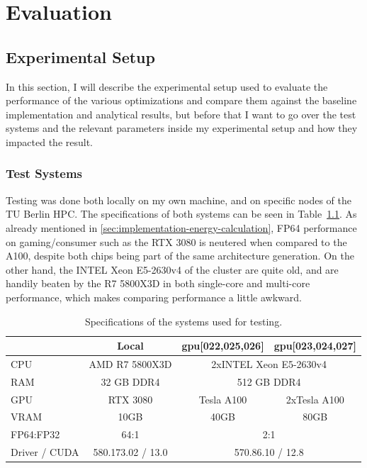 \chapter{Evaluation}
\label{sec:evaluation}

\section{Experimental Setup}
\label{sec:evaluation-experimental-setup}

In this section, I will describe the experimental setup used to evaluate the performance of the various optimizations and compare them against the baseline implementation and analytical results, but before that I want to go over the test systems and the relevant parameters inside my experimental setup and how they impacted the result.

\subsection{Test Systems}
\label{sec:evaluation-experimental-setup-test-systems}

Testing was done both locally on my own machine, and on specific nodes of the TU Berlin HPC. 
The specifications of both systems can be seen in Table~\ref{tab:test-systems}. 
As already mentioned in \ref{sec:implementation-energy-calculation}, FP64 performance on gaming/consumer such as the RTX 3080 is neutered when compared to the A100, despite both chips being part of the same architecture generation. 
On the other hand, the INTEL Xeon E5-2630v4 of the cluster are quite old, and are handily beaten by the R7 5800X3D in both single-core and multi-core performance, which makes comparing performance a little awkward.

\begin{table}[htbp]
    \centering
    \begin{tabular}{lccc}
        \toprule
         & Local & gpu[022,025,026] & gpu[023,024,027] \\
        \midrule
        CPU & AMD R7 5800X3D & \multicolumn{2}{c}{2xINTEL Xeon E5-2630v4} \\
        RAM & 32 GB DDR4 & \multicolumn{2}{c}{512 GB DDR4} \\
        GPU & RTX 3080 & Tesla A100 & 2xTesla A100 \\
        VRAM & 10GB & 40GB & 80GB \\
        FP64:FP32 & 64:1 & \multicolumn{2}{c}{2:1} \\
        Driver / CUDA & 580.173.02 / 13.0 & \multicolumn{2}{c}{570.86.10 / 12.8} \\
        \bottomrule
    \end{tabular}
    \caption{Specifications of the systems used for testing.}
    \label{tab:test-systems}
\end{table}


